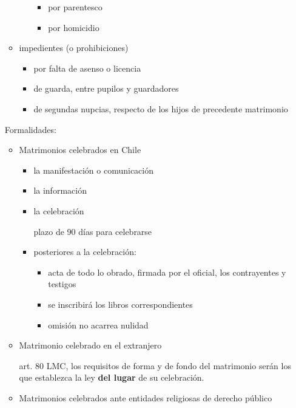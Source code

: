 \documentclass[]{article}
\providecommand{\tightlist}{%
  \setlength{\itemsep}{0pt}\setlength{\parskip}{0pt}}
\begin{document}
\begin{itemize}
\begin{itemize}
\begin{itemize}
      \begin{itemize}
      \tightlist
      \item
        por parentesco
      \item
        por homicidio
      \end{itemize}
    \end{itemize}
  \item
    impedientes (o prohibiciones)

    \begin{itemize}
    \tightlist
    \item
      por falta de asenso o licencia
    \item
      de guarda, entre pupilos y guardadores
    \item
      de segundas nupcias, respecto de los hijos de precedente
      matrimonio
    \end{itemize}
  \end{itemize}

  Formalidades:

  \begin{itemize}
  \item
    Matrimonios celebrados en Chile

    \begin{itemize}
    \item
      la manifestación o comunicación
    \item
      la información
    \item
      la celebración

      plazo de 90 días para celebrarse
    \item
      posteriores a la celebración:

      \begin{itemize}
      \tightlist
      \item
        acta de todo lo obrado, firmada por el oficial, los contrayentes
        y testigos
      \item
        se inscribirá los libros correspondientes
      \item
        omisión no acarrea nulidad
      \end{itemize}
    \end{itemize}
  \item
    Matrimonio celebrado en el extranjero

    art. 80 LMC, los requisitos de forma y de fondo del matrimonio serán
    los que establezca la ley \textbf{del lugar} de su celebración.
  \item
    Matrimonios celebrados ante entidades religiosas de derecho público


\end{itemize}
\end{itemize}
\end{document}
